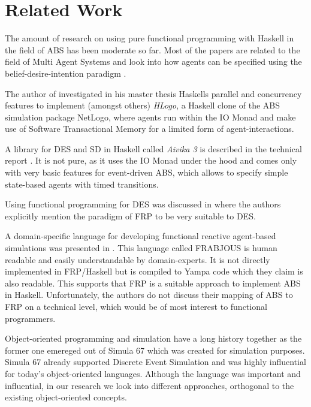 \section{Related Work}
\label{sec:related_work}
The amount of research on using pure functional programming with Haskell in the field of ABS has been moderate so far. Most of the papers are related to the field of Multi Agent Systems and look into how agents can be specified using the belief-desire-intention paradigm \cite{de_jong_suitability_2014, sulzmann_specifying_2007, jankovic_functional_2007}.

The author of \cite{bezirgiannis_improving_2013} investigated in his master thesis Haskells parallel and concurrency features to implement (amongst others) \textit{HLogo}, a Haskell clone of the ABS simulation package NetLogo, where agents run within the IO Monad and make use of Software Transactional Memory for a limited form of agent-interactions.

A library for DES and SD in Haskell called \textit{Aivika 3} is described in the technical report \cite{sorokin_aivika_2015}. It is not pure, as it uses the IO Monad under the hood and comes only with very basic features for event-driven ABS, which allows to specify simple state-based agents with timed transitions.

Using functional programming for DES was discussed in \cite{jankovic_functional_2007} where the authors explicitly mention the paradigm of FRP to be very suitable to DES.

A domain-specific language for developing functional reactive agent-based simulations was presented in \cite{vendrov_frabjous:_2014}. This language called FRABJOUS is human readable and easily understandable by domain-experts. It is not directly implemented in FRP/Haskell but is compiled to Yampa code which they claim is also readable. This supports that FRP is a suitable approach to implement ABS in Haskell. Unfortunately, the authors do not discuss their mapping of ABS to FRP on a technical level, which would be of most interest to functional programmers.

Object-oriented programming and simulation have a long history together as the former one emereged out of Simula 67 \cite{dahl_birth_2002} which was created for simulation purposes. Simula 67 already supported Discrete Event Simulation and was highly influential for today's object-oriented languages. Although the language was important and influential, in our research we look into different approaches, orthogonal to the existing object-oriented concepts.

